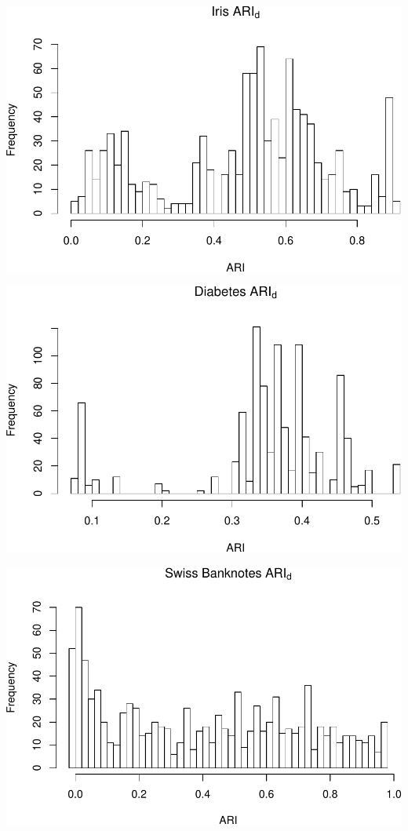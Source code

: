 \begin{center}\includegraphics[width=1\linewidth]{Report_files/figure-latex/unnamed-chunk-15-2} \end{center}

\begin{center}\includegraphics[width=1\linewidth]{Report_files/figure-latex/unnamed-chunk-15-3} \end{center}

\begin{center}\includegraphics[width=1\linewidth]{Report_files/figure-latex/unnamed-chunk-15-4} \end{center}

